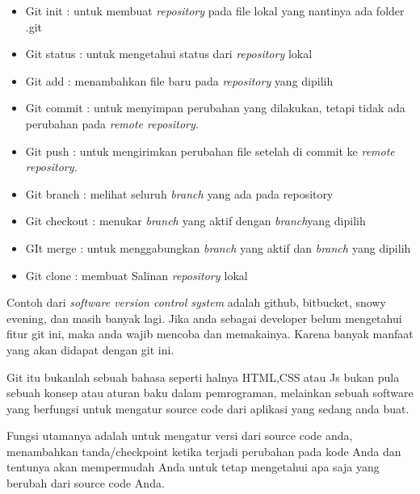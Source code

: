 \begin{itemize}
\item Git init : untuk membuat $  $\textit{repository} $  $pada file lokal yang nantinya ada folder .git \par
\noindent 
\item Git status : untuk mengetahui status dari $  $\textit{repository} $  $lokal \par
\noindent 
\item Git add : menambahkan file baru pada $  $\textit{repository} $  $yang dipilih \par
\noindent 
\item Git commit : untuk menyimpan perubahan yang dilakukan, tetapi tidak ada perubahan pada $  $\textit{remote repository.} \par
\noindent 
\item Git push : untuk mengirimkan perubahan file setelah di commit ke $  $\textit{remote repository.} \par
\noindent 
\item Git branch : melihat seluruh $  $\textit{branch $  $}yang ada pada repository \par
\noindent 
\item Git checkout : menukar $  $\textit{branch $  $}yang aktif dengan $  $\textit{branch}yang dipilih \par
\noindent 
\item GIt merge : untuk menggabungkan $  $\textit{branch $  $}yang aktif dan $  $\textit{branch $  $}yang dipilih \par
\noindent 
\item Git clone : membuat Salinan $  $\textit{repository $  $}lokal\end{itemize}
 \par
\noindent 
Contoh dari $  $\textit{software version control system} $  $adalah github, bitbucket, snowy evening, dan masih banyak lagi. Jika anda sebagai developer belum mengetahui fitur git ini, maka anda wajib mencoba dan memakainya. Karena banyak manfaat yang akan didapat dengan git ini. \par
\noindent 
Git itu bukanlah sebuah bahasa seperti halnya HTML,CSS atau Js bukan pula sebuah konsep atau aturan baku dalam pemrograman, melainkan sebuah software yang berfungsi untuk mengatur source code dari aplikasi yang sedang anda buat. \par
\noindent 
Fungsi utamanya adalah untuk mengatur versi dari source code anda, menambahkan tanda/checkpoint ketika terjadi perubahan pada kode Anda dan tentunya akan mempermudah Anda untuk tetap mengetahui apa saja yang berubah dari source code Anda. \par
